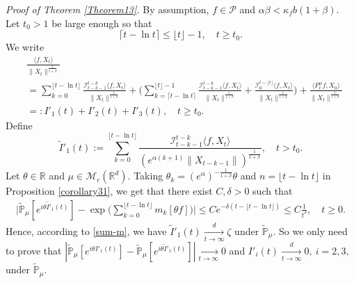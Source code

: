 \documentclass[12pt,a4paper]{amsart}
\theoremstyle{plain}
\theoremstyle{definition}
\numberwithin{equation}{section}
\begin{document}
{\it Proof of Theorem \ref{Theorem13}.}\quad
By assumption, $f\in \mathcal P$  and $\alpha \beta < \kappa_f b(1+\beta)$.
	Let $t_0 > 1$ be large enough so that
\[
	\lceil t - \ln t\rceil
	\leq \lfloor t \rfloor - 1,
	\quad t\geq t_0.
\]
	We write
\begin{align*}
	&\frac{\langle f,X_t\rangle}{\|X_t\|^{\frac{1}{1+\beta}}}
	\\&=\sum_{k=0}^{\lfloor t-\ln t \rfloor} \frac{\mathcal I_{t-k-1}^{t-k}\langle f ,X_t\rangle}{\|X_t\|^{\frac{1}{1+\beta}}}+ \Big(\sum_{k=\lceil t-\ln t \rceil}^{\lfloor t \rfloor-1} \frac{\mathcal I_{t-k-1}^{t-k}\langle f ,X_t\rangle}{\|X_t\|^{\frac{1}{1+\beta}}}+\frac{\mathcal I_0^{t-\lfloor t \rfloor}\langle f ,X_t\rangle}{\|X_t\|^{\frac{1}{1+\beta}}}\Big) +
\frac{\langle P^\alpha_t f, X_0\rangle}{\|X_t\|^{\frac{1}{1+\beta}}}
	\\&=:I'_1(t)+I'_2(t)+I'_3(t),
	\quad t\geq t_0.
\end{align*}
	Define
 \[
 	\tilde I'_1(t)
 	:=\sum_{k=0}^{\lfloor t-\ln t \rfloor}\frac{\mathcal I_{t-k-1}^{t-k}\langle f ,X_t\rangle}{( e^{\alpha(k+1)}\|X_{t-k-1}\|)^{\frac{1}{1+\beta}}},
 	\quad t > t_0.
 \]
    Let $\theta\in \mathbb R$ and $\mu\in \mathcal M_c(\mathbb R^d)$.
    Taking $\theta_k=(e^{\alpha})^{-\frac{1}{1+\beta}} \theta $ and $n={\lfloor t-\ln t \rfloor}$ in Proposition \ref{corollary31},
    we get that there exist $C,\delta > 0$ such that
\begin{align*}
    \Big|\mathbb{\tilde{P}}_{\mu} [e^{i\theta\tilde I'_1(t)} ]-\exp\Big(\sum_{k=0}^{\lfloor t-\ln t \rfloor}m_k[\theta f]\Big)\Big|
    \leq C e^{-\delta(t - \lfloor t - \ln t\rfloor)}
    \leq C \frac{1}{t^{\delta}},
    \quad t\geq 0.
\end{align*}
Hence, according to \eqref{sum-m}, we have $\tilde I'_1(t)\xrightarrow[t\to \infty]{d} \zeta$ under $\tilde {\mathbb P}_\mu$.
   So we only need to prove that $|\mathbb{\tilde{P}}_{\mu}[e^{i\theta I'_1(t)}]-\mathbb{\tilde{P}}_{\mu}[e^{i\theta\tilde I'_1(t)}]|\xrightarrow[t\to \infty]{} 0$ and $I'_i(t)\xrightarrow[t\to \infty]{d} 0,~i=2,3,$ under $\tilde {\mathbb P}_\mu$.
\end{document}
